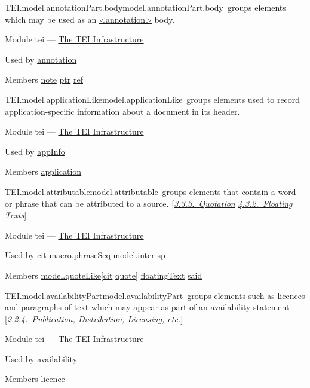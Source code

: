 \begin{reflist}
\item[]\begin{specHead}{TEI.model.annotationPart.body}{model.annotationPart.body} groups elements which may be used as an \hyperref[TEI.annotation]{<annotation>} body.\end{specHead} 
    \item[{Module}]
  tei — \hyperref[ST]{The TEI Infrastructure}
    \item[{Used by}]
  \hyperref[TEI.annotation]{annotation}
    \item[{Members}]
  \hyperref[TEI.note]{note} \hyperref[TEI.ptr]{ptr} \hyperref[TEI.ref]{ref}
\end{reflist}  
\begin{reflist}
\item[]\begin{specHead}{TEI.model.applicationLike}{model.applicationLike} groups elements used to record application-specific information about a document in its header.\end{specHead} 
    \item[{Module}]
  tei — \hyperref[ST]{The TEI Infrastructure}
    \item[{Used by}]
  \hyperref[TEI.appInfo]{appInfo}
    \item[{Members}]
  \hyperref[TEI.application]{application}
\end{reflist}  
\begin{reflist}
\item[]\begin{specHead}{TEI.model.attributable}{model.attributable} groups elements that contain a word or phrase that can be attributed to a source. [\textit{\hyperref[COHQQ]{3.3.3.\ Quotation}} \textit{\hyperref[DSFLT]{4.3.2.\ Floating Texts}}]\end{specHead} 
    \item[{Module}]
  tei — \hyperref[ST]{The TEI Infrastructure}
    \item[{Used by}]
  \hyperref[TEI.cit]{cit} \hyperref[TEI.macro.phraseSeq]{macro.phraseSeq} \hyperref[TEI.model.inter]{model.inter} \hyperref[TEI.sp]{sp}
    \item[{Members}]
  \hyperref[TEI.model.quoteLike]{model.quoteLike}[\hyperref[TEI.cit]{cit} \hyperref[TEI.quote]{quote}] \hyperref[TEI.floatingText]{floatingText} \hyperref[TEI.said]{said}
\end{reflist}  
\begin{reflist}
\item[]\begin{specHead}{TEI.model.availabilityPart}{model.availabilityPart} groups elements such as licences and paragraphs of text which may appear as part of an availability statement [\textit{\hyperref[HD24]{2.2.4.\ Publication, Distribution, Licensing, etc.}}]\end{specHead} 
    \item[{Module}]
  tei — \hyperref[ST]{The TEI Infrastructure}
    \item[{Used by}]
  \hyperref[TEI.availability]{availability}
    \item[{Members}]
  \hyperref[TEI.licence]{licence}
\end{reflist}  
